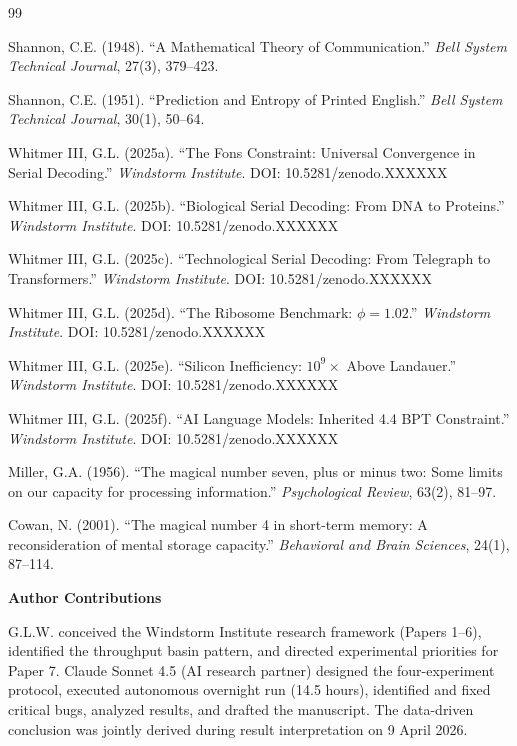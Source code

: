 \documentclass[11pt,a4paper]{article}
\begin{document}
\begin{thebibliography}{99}

Shannon, C.E. (1948). ``A Mathematical Theory of Communication.'' \textit{Bell System Technical Journal}, 27(3), 379--423.

Shannon, C.E. (1951). ``Prediction and Entropy of Printed English.'' \textit{Bell System Technical Journal}, 30(1), 50--64.

Whitmer III, G.L. (2025a). ``The Fons Constraint: Universal Convergence in Serial Decoding.'' \textit{Windstorm Institute}. DOI: 10.5281/zenodo.XXXXXX

Whitmer III, G.L. (2025b). ``Biological Serial Decoding: From DNA to Proteins.'' \textit{Windstorm Institute}. DOI: 10.5281/zenodo.XXXXXX

Whitmer III, G.L. (2025c). ``Technological Serial Decoding: From Telegraph to Transformers.'' \textit{Windstorm Institute}. DOI: 10.5281/zenodo.XXXXXX

Whitmer III, G.L. (2025d). ``The Ribosome Benchmark: $\phi = 1.02$.'' \textit{Windstorm Institute}. DOI: 10.5281/zenodo.XXXXXX

Whitmer III, G.L. (2025e). ``Silicon Inefficiency: $10^9\times$ Above Landauer.'' \textit{Windstorm Institute}. DOI: 10.5281/zenodo.XXXXXX

Whitmer III, G.L. (2025f). ``AI Language Models: Inherited 4.4 BPT Constraint.'' \textit{Windstorm Institute}. DOI: 10.5281/zenodo.XXXXXX

Miller, G.A. (1956). ``The magical number seven, plus or minus two: Some limits on our capacity for processing information.'' \textit{Psychological Review}, 63(2), 81--97.

Cowan, N. (2001). ``The magical number 4 in short-term memory: A reconsideration of mental storage capacity.'' \textit{Behavioral and Brain Sciences}, 24(1), 87--114.

\end{thebibliography}

\vspace{1cm}

\noindent\textbf{Author Contributions}

G.L.W. conceived the Windstorm Institute research framework (Papers 1--6), identified the throughput basin pattern, and directed experimental priorities for Paper 7. Claude Sonnet 4.5 (AI research partner) designed the four-experiment protocol, executed autonomous overnight run (14.5 hours), identified and fixed critical bugs, analyzed results, and drafted the manuscript. The data-driven conclusion was jointly derived during result interpretation on 9 April 2026.
\end{document}
